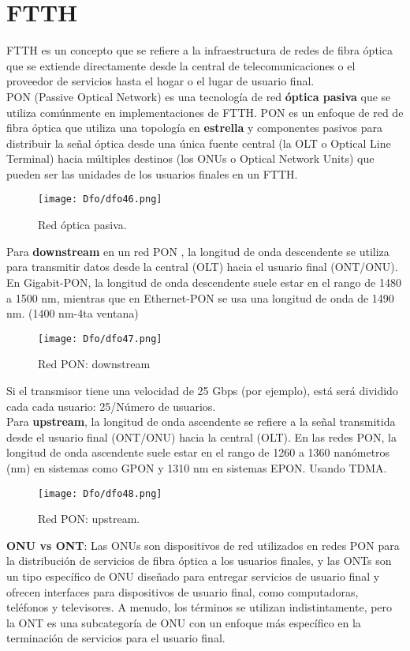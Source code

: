 \documentclass[
	12pt, %
	fleqn, %
	a4paper, %
	oneside, %
]{LegrandOrangeBook}
\begin{document}
\chapter{FTTH}
FTTH es un concepto que se refiere a la infraestructura de redes de fibra óptica que se extiende directamente desde la central de telecomunicaciones o el proveedor de servicios hasta el hogar o el lugar de usuario final.\\
PON (Passive Optical Network) es una tecnología de red \textbf{óptica pasiva} que se utiliza comúnmente en implementaciones de FTTH. PON es un enfoque de red de fibra óptica que utiliza una topología en \textbf{estrella} y componentes pasivos para distribuir la señal óptica desde una única fuente central (la OLT o Optical Line Terminal) hacia múltiples destinos (los ONUs o Optical Network Units) que pueden ser las unidades de los usuarios finales en un FTTH.
\begin{figure}[H]
\centering
\texttt{[image: Dfo/dfo46.png]}
\caption{Red óptica pasiva.}
\end{figure}
Para \textbf{downstream} en un red PON , la longitud de onda descendente se utiliza para transmitir datos desde la central (OLT) hacia el usuario final (ONT/ONU). En Gigabit-PON, la longitud de onda descendente suele estar en el rango de 1480 a 1500 nm, mientras que en Ethernet-PON se usa una longitud de onda de 1490 nm. (1400 nm-4ta ventana)
\begin{figure}[H]
\centering
\texttt{[image: Dfo/dfo47.png]}
\caption{Red PON: downstream}
\end{figure}
Si el transmisor tiene una velocidad de 25 Gbps (por ejemplo), está será dividido cada cada usuario: 25/Número de usuarios.\\
Para \textbf{upstream}, la longitud de onda ascendente se refiere a la señal transmitida desde el usuario final (ONT/ONU) hacia la central (OLT). En las redes PON, la longitud de onda ascendente suele estar en el rango de 1260 a 1360 nanómetros (nm) en sistemas como GPON y 1310 nm en sistemas EPON. Usando TDMA.
\begin{figure}[H]
\centering
\texttt{[image: Dfo/dfo48.png]}
\caption{Red PON: upstream.}
\end{figure}

\begin{remark}
\textbf{ONU vs ONT}: Las ONUs son dispositivos de red utilizados en redes PON para la distribución de servicios de fibra óptica a los usuarios finales, y las ONTs son un tipo específico de ONU diseñado para entregar servicios de usuario final y ofrecen interfaces para dispositivos de usuario final, como computadoras, teléfonos y televisores. A menudo, los términos se utilizan indistintamente, pero la ONT es una subcategoría de ONU con un enfoque más específico en la terminación de servicios para el usuario final.
\end{remark}
\end{document}
